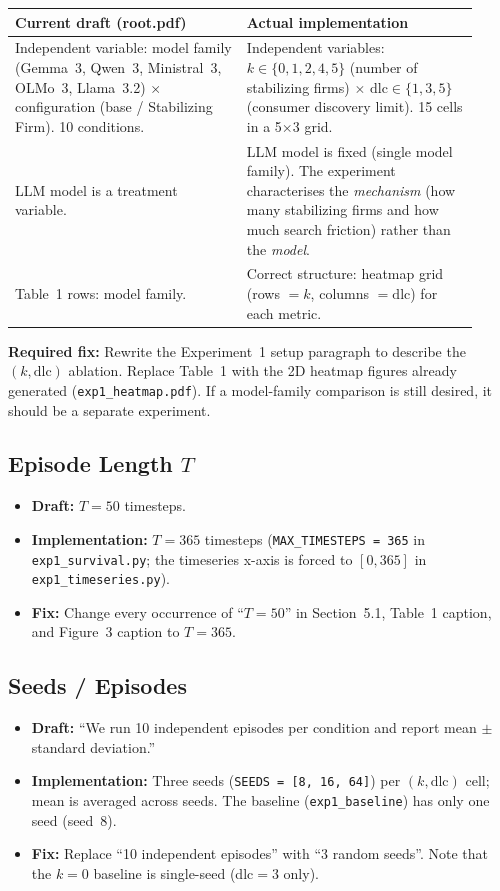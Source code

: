 \documentclass{article}
\begin{document}
\begin{tabular}{p{0.46\linewidth} p{0.46\linewidth}}
\toprule
\textbf{Current draft (root.pdf)} & \textbf{Actual implementation} \\
\midrule
Independent variable: model family (Gemma~3, Qwen~3, Ministral~3, OLMo~3, Llama~3.2) $\times$ configuration (base / Stabilizing Firm). 10 conditions. &
Independent variables: $k \in \{0,1,2,4,5\}$ (number of stabilizing firms) $\times$ $\mathrm{dlc} \in \{1,3,5\}$ (consumer discovery limit). 15 cells in a 5$\times$3 grid. \\
\midrule
LLM model is a treatment variable. &
LLM model is fixed (single model family). The experiment characterises the \emph{mechanism} (how many stabilizing firms and how much search friction) rather than the \emph{model}. \\
\midrule
Table~1 rows: model family. &
Correct structure: heatmap grid (rows $= k$, columns $= \mathrm{dlc}$) for each metric. \\
\bottomrule
\end{tabular}

\medskip
\textbf{Required fix:} Rewrite the Experiment~1 setup paragraph to describe the
$(k,\mathrm{dlc})$ ablation.  Replace Table~1 with the 2D heatmap figures
already generated (\texttt{exp1\_heatmap.pdf}).  If a model-family comparison is
still desired, it should be a separate experiment.

\subsection{Episode Length $T$}

\begin{itemize}
  \item \textbf{Draft:} $T = 50$ timesteps.
  \item \textbf{Implementation:} $T = 365$ timesteps (\texttt{MAX\_TIMESTEPS = 365}
        in \texttt{exp1\_survival.py}; the timeseries x-axis is forced to $[0, 365]$
        in \texttt{exp1\_timeseries.py}).
  \item \textbf{Fix:} Change every occurrence of ``$T=50$'' in Section~5.1,
        Table~1 caption, and Figure~3 caption to $T=365$.
\end{itemize}

\subsection{Seeds / Episodes}

\begin{itemize}
  \item \textbf{Draft:} ``We run 10 independent episodes per condition and report
        mean $\pm$ standard deviation.''
  \item \textbf{Implementation:} Three seeds (\texttt{SEEDS = [8, 16, 64]}) per
        $(k,\mathrm{dlc})$ cell; mean is averaged across seeds. The baseline
        (\texttt{exp1\_baseline}) has only one seed (seed~8).
  \item \textbf{Fix:} Replace ``10 independent episodes'' with ``3 random seeds''.
        Note that the $k=0$ baseline is single-seed (dlc$=3$ only).
\end{itemize}
\end{document}
